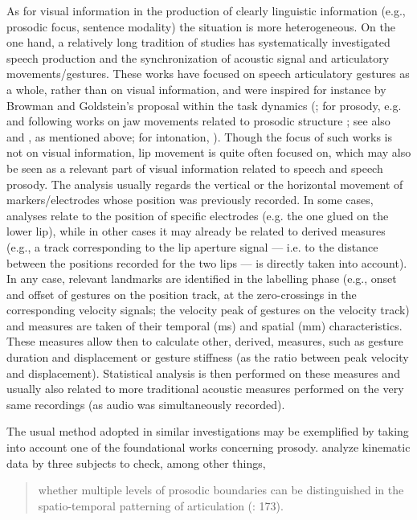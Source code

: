 \documentclass[output=paper]{langsci/langscibook}
\begin{document}
As for visual information in the production of clearly linguistic information (e.g., prosodic focus, sentence modality) the situation is more heterogeneous. On the one hand, a relatively long tradition of studies has systematically investigated speech production and the synchronization of acoustic signal and articulatory movements\slash gestures. These works have focused on speech articulatory gestures as a whole, rather than on visual information, and were inspired for instance by Browman and Goldstein’s proposal within the task dynamics (\citealt{Browman1984,Browman1985}; for prosody, e.g. \citealt{Edwards1991,Beckman1992} and following works on jaw movements related to prosodic structure \citealt{Byrd1998,Byrd2003}; see also \citealt{GiliFivela2008book} and \citealt{Avesani2007}, as mentioned above; for intonation, \citealt{DImperio.2007,PrietoETAL2007,Muecke2009}). Though the focus of such works is not on visual information, lip movement is quite often focused on, which may also be seen as a relevant part of visual information related to speech and speech prosody. The analysis usually regards the vertical or the horizontal movement of markers\slash electrodes whose position was previously recorded. In some cases, analyses relate to the position of specific electrodes (e.g. the one glued on the lower lip), while in other cases it may already be related to derived measures (e.g., a track corresponding to the lip aperture signal — i.e. to the distance between the positions recorded for the two lips — is directly taken into account). In any case, relevant landmarks are identified in the labelling phase (e.g., onset and offset of gestures on the position track, at the zero-crossings in the corresponding velocity signals; the velocity peak of gestures on the velocity track) and measures are taken of their temporal (ms) and spatial (mm) characteristics. These measures allow then to calculate other, derived, measures, such as gesture duration and displacement or gesture stiffness (as the ratio between peak velocity and displacement). Statistical analysis is then performed on these measures and usually also related to more traditional acoustic measures performed on the very same recordings (as audio was simultaneously recorded).

The usual method adopted in similar investigations may be exemplified by taking into account one of the foundational works concerning prosody. \citet{Byrd1998} analyze kinematic data by three subjects to check, among other things,

\begin{quote}
whether multiple levels of prosodic boundaries can be distinguished in the spatio-temporal patterning of articulation (\citealt{Byrd1998}: 173).
\end{quote}
\end{document}

